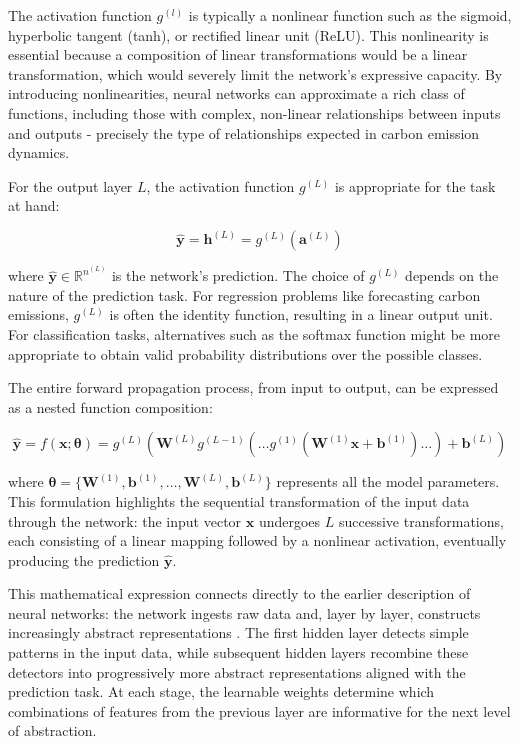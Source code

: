 The activation function \(g^{(l)}\) is typically a nonlinear function such as the sigmoid, hyperbolic tangent (tanh), or rectified linear unit (ReLU). This nonlinearity is essential because a composition of linear transformations would be a linear transformation, which would severely limit the network's expressive capacity. By introducing nonlinearities, neural networks can approximate a rich class of functions, including those with complex, non-linear relationships between inputs and outputs - precisely the type of relationships expected in carbon emission dynamics.

For the output layer \(L\), the activation function \(g^{(L)}\) is appropriate for the task at hand:

\[
  \mathbf{\hat{y}} = \mathbf{h}^{(L)} = g^{(L)}(\mathbf{a}^{(L)})
\]

where \(\mathbf{\hat{y}} \in \mathbb{R}^{n^{(L)}}\) is the network's prediction. The choice of \(g^{(L)}\) depends on the nature of the prediction task. For regression problems like forecasting carbon emissions, \(g^{(L)}\) is often the identity function, resulting in a linear output unit. For classification tasks, alternatives such as the softmax function might be more appropriate to obtain valid probability distributions over the possible classes.

The entire forward propagation process, from input to output, can be expressed as a nested function composition:

\[
  \mathbf{\hat{y}} = f(\mathbf{x}; \mathbf{\theta}) = g^{(L)}(\mathbf{W}^{(L)}g^{(L-1)}(\ldots g^{(1)}(\mathbf{W}^{(1)}\mathbf{x} + \mathbf{b}^{(1)})\ldots) + \mathbf{b}^{(L)})
\]

where \(\mathbf{\theta} = \{\mathbf{W}^{(1)}, \mathbf{b}^{(1)}, \ldots, \mathbf{W}^{(L)}, \mathbf{b}^{(L)}\}\) represents all the model parameters. This formulation highlights the sequential transformation of the input data through the network: the input vector \(\mathbf{x}\) undergoes \(L\) successive transformations, each consisting of a linear mapping followed by a nonlinear activation, eventually producing the prediction \(\mathbf{\hat{y}}\).

This mathematical expression connects directly to the earlier description of neural networks: the network ingests raw data and, layer by layer, constructs increasingly abstract representations \parencite{goodfellow2016}. The first hidden layer detects simple patterns in the input data, while subsequent hidden layers recombine these detectors into progressively more abstract representations aligned with the prediction task. At each stage, the learnable weights determine which combinations of features from the previous layer are informative for the next level of abstraction.

